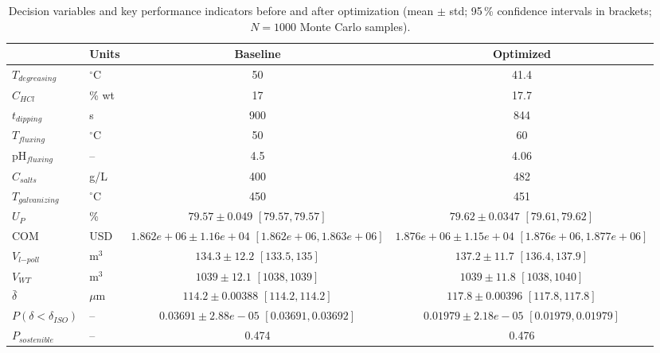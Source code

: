 \begin{table}[htbp]
\centering
\caption{Decision variables and key performance indicators before and after optimization (mean $\pm$ std; 95\,\% confidence intervals in brackets; $N = 1000$ Monte Carlo samples).}
\label{tab:summary}
\begin{tabular}{llcc}
\toprule
 & Units & Baseline & Optimized \\
\midrule
$T_{degreasing}$ & $^{\circ}$C & 50 & 41.4 \\
$C_{HCl}$ & \% wt & 17 & 17.7 \\
$t_{dipping}$ & s & 900 & 844 \\
$T_{fluxing}$ & $^{\circ}$C & 50 & 60 \\
pH$_{fluxing}$ & -- & 4.5 & 4.06 \\
$C_{salts}$ & g/L & 400 & 482 \\
$T_{galvanizing}$ & $^{\circ}$C & 450 & 451 \\
\midrule
$U_P$ & \% & $79.57 \pm 0.049$ $[79.57, 79.57]$ & $79.62 \pm 0.0347$ $[79.61, 79.62]$ \\
COM & USD & $1.862e+06 \pm 1.16e+04$ $[1.862e+06, 1.863e+06]$ & $1.876e+06 \pm 1.15e+04$ $[1.876e+06, 1.877e+06]$ \\
$V_{l\mathrm{-}poll}$ & m$^3$ & $134.3 \pm 12.2$ $[133.5, 135]$ & $137.2 \pm 11.7$ $[136.4, 137.9]$ \\
$V_{WT}$ & m$^3$ & $1039 \pm 12.1$ $[1038, 1039]$ & $1039 \pm 11.8$ $[1038, 1040]$ \\
$\bar{\delta}$ & $\mu$m & $114.2 \pm 0.00388$ $[114.2, 114.2]$ & $117.8 \pm 0.00396$ $[117.8, 117.8]$ \\
$P(\delta < \delta_{ISO})$ & -- & $0.03691 \pm 2.88e-05$ $[0.03691, 0.03692]$ & $0.01979 \pm 2.18e-05$ $[0.01979, 0.01979]$ \\
\midrule
$P_{sostenible}$ & -- & 0.474 & 0.476 \\
\bottomrule
\end{tabular}
\end{table}
